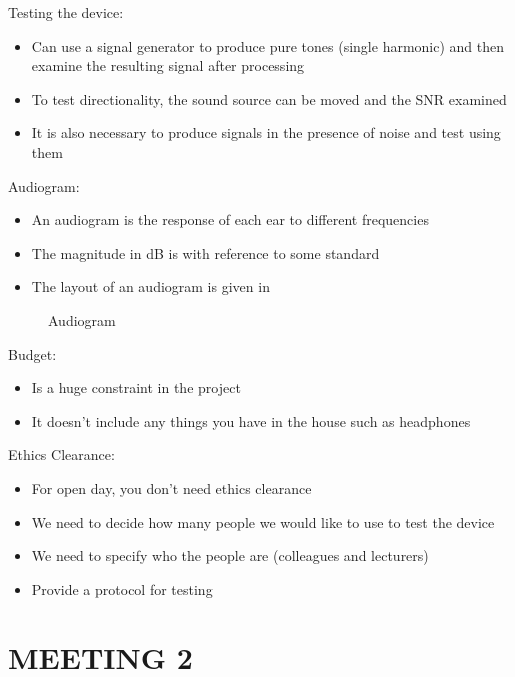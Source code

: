 \documentclass[10pt,onecolumn]{witseiepaper}
\begin{document}
Testing the device:
\begin{itemize}
	\item Can use a signal generator to produce pure tones (single harmonic) and then examine the resulting signal after processing 
	\item To test directionality, the sound source can be moved and the SNR examined
	\item It is also necessary to produce signals in the presence of noise and test using them
\end{itemize}

Audiogram:
\begin{itemize}
	\item An audiogram is the response of each ear to different frequencies
	\item The magnitude in dB is with reference to some standard
	\item The layout of an audiogram is given in 
\end{itemize}
\begin{figure}[h]
\centering
{}
\caption{Audiogram}
\label{fig:audiogram}
\end{figure}

Budget:
\begin{itemize}
	\item Is a huge constraint in the project
	\item It doesn't include any things you have in the house such as headphones 
\end{itemize}

Ethics Clearance:
\begin{itemize}
	\item For open day, you don't need ethics clearance
	\item We need to decide how many people we would like to use to test the device
	\item We need to specify who the people are (colleagues and lecturers)
	\item Provide a protocol for testing
\end{itemize}


\section*{MEETING 2}
\end{document}
